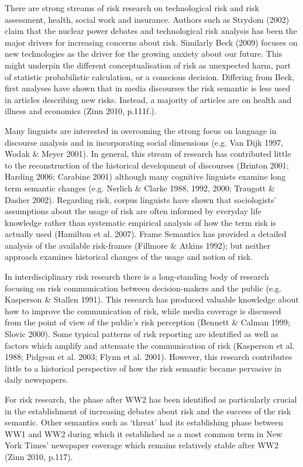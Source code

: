There are strong streams of risk research on technological risk and risk assessment, health, social work and insurance. Authors such as Strydom (2002) claim that the nuclear power debates and technological risk analysis has been the major drivers for increasing concerns about risk. Similarly Beck (2009) focuses on new technologies as the driver for the growing anxiety about our future. This might underpin the different conceptualisation of risk as unexpected harm, part of statistic probabilistic calculation, or a conscious decision. Differing from Beck, first analyses have shown that in media discourses the risk semantic is less used in articles describing new risks. Instead, a majority of articles are on health and illness and economics (Zinn 2010, p.111f.).

Many linguists are interested in overcoming the strong focus on language in discourse analysis and in incorporating social dimensions (e.g. Van Dijk 1997, Wodak \& Meyer 2001). In general, this stream of research has contributed little to the reconstruction of the historical development of discourses (Brinton 2001; Harding 2006; Carabine 2001) although many cognitive linguists examine long term semantic changes (e.g. Nerlich \& Clarke 1988, 1992, 2000; Traugott \& Dasher 2002). Regarding risk, corpus linguists have shown that sociologists' assumptions about the usage of risk are often informed by everyday life knowledge rather than systematic empirical analysis of how the term risk is actually used (Hamilton et al. 2007). Frame Semantics has provided a detailed analysis of the available risk-frames (Fillmore \& Atkins 1992); but neither approach examines historical changes of the usage and notion of risk.

In interdisciplinary risk research there is a long-standing body of research focusing on risk communication between decision-makers and the public (e.g. Kasperson \& Stallen 1991). This research has produced valuable knowledge about how to improve the communication of risk, while media coverage is discussed from the point of view of the public's risk perception (Bennett \& Calman 1999; Slovic 2000). Some typical patterns of risk reporting are identified as well as factors which amplify and attenuate the communication of risk (Kasperson et al. 1988; Pidgeon et al. 2003; Flynn et al. 2001). However, this research contributes little to a historical perspective of how the risk semantic became pervasive in daily newspapers.

For risk research, the phase after WW2 has been identified as particularly crucial in the establishment of increasing debates about risk and the success of the risk semantic. Other semantics such as `threat' had its establishing phase between WW1 and WW2 during which it established as a most common term in New York Times' newspaper coverage which remains relatively stable after WW2 (Zinn 2010, p.117).

